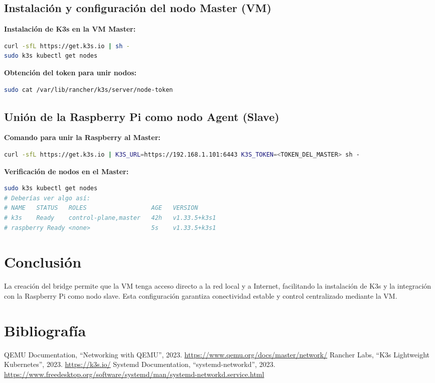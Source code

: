 \documentclass[12pt, a4paper]{article}
\begin{document}
\subsection{Instalación y configuración del nodo Master (VM)}

\textbf{Instalación de K3s en la VM Master:}

\begin{lstlisting}[language=bash]
curl -sfL https://get.k3s.io | sh -
sudo k3s kubectl get nodes
\end{lstlisting}

\textbf{Obtención del token para unir nodos:}

\begin{lstlisting}[language=bash]
sudo cat /var/lib/rancher/k3s/server/node-token
\end{lstlisting}

\subsection{Unión de la Raspberry Pi como nodo Agent (Slave)}

\textbf{Comando para unir la Raspberry al Master:}

\begin{lstlisting}[language=bash]
curl -sfL https://get.k3s.io | K3S_URL=https://192.168.1.101:6443 K3S_TOKEN=<TOKEN_DEL_MASTER> sh -
\end{lstlisting}

\textbf{Verificación de nodos en el Master:}

\begin{lstlisting}[language=bash]
sudo k3s kubectl get nodes
# Deberías ver algo así:
# NAME   STATUS   ROLES                  AGE   VERSION
# k3s    Ready    control-plane,master   42h   v1.33.5+k3s1
# raspberry Ready <none>                 5s    v1.33.5+k3s1
\end{lstlisting}

\section{Conclusión}

La creación del bridge permite que la VM tenga acceso directo a la red local y a Internet, facilitando la instalación de K3s y la integración con la Raspberry Pi como nodo slave. Esta configuración garantiza conectividad estable y control centralizado mediante la VM.

\clearpage
\section{Bibliografía}
\begin{thebibliography}{9}
QEMU Documentation, ``Networking with QEMU'', 2023. \url{https://www.qemu.org/docs/master/network/}
Rancher Labs, ``K3s Lightweight Kubernetes'', 2023. \url{https://k3s.io/}
Systemd Documentation, ``systemd-networkd'', 2023. \url{https://www.freedesktop.org/software/systemd/man/systemd-networkd.service.html}
\end{thebibliography}
\end{document}
